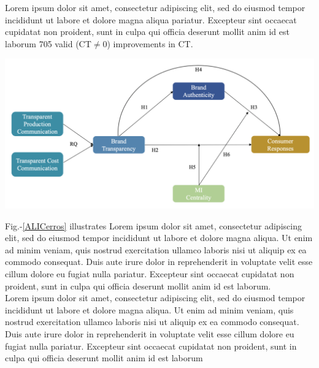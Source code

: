 \documentclass[a0,portrait]{a0poster}
\begin{document}
\begin{minipage}[c]{\linewidth}
\begin{framed}
\begin{multicols}{2}
Lorem ipsum dolor sit amet, consectetur adipiscing elit, sed do eiusmod tempor incididunt ut labore et dolore magna aliqua pariatur. Excepteur sint occaecat cupidatat non proident, sunt in culpa qui officia deserunt mollit anim id est laborum 705 valid (CT$\neq$0) improvements in CT.
\begin{center}
\includegraphics[width=0.9\linewidth]{figures/placeholder}
\label{ALICerros}
\end{center}
Fig.-\ref{ALICerros} illustrates Lorem ipsum dolor sit amet, consectetur adipiscing elit, sed do eiusmod tempor incididunt ut labore et dolore magna aliqua. Ut enim ad minim veniam, quis nostrud exercitation ullamco laboris nisi ut aliquip ex ea commodo consequat. Duis aute irure dolor in reprehenderit in voluptate velit esse cillum dolore eu fugiat nulla pariatur. Excepteur sint occaecat cupidatat non proident, sunt in culpa qui officia deserunt mollit anim id est laborum.\\
Lorem ipsum dolor sit amet, consectetur adipiscing elit, sed do eiusmod tempor incididunt ut labore et dolore magna aliqua. Ut enim ad minim veniam, quis nostrud exercitation ullamco laboris nisi ut aliquip ex ea commodo consequat. Duis aute irure dolor in reprehenderit in voluptate velit esse cillum dolore eu fugiat nulla pariatur. Excepteur sint occaecat cupidatat non proident, sunt in culpa qui officia deserunt mollit anim id est laborum

\color{Maroon}

\end{multicols}
\end{framed}
\end{minipage}
\end{document}
